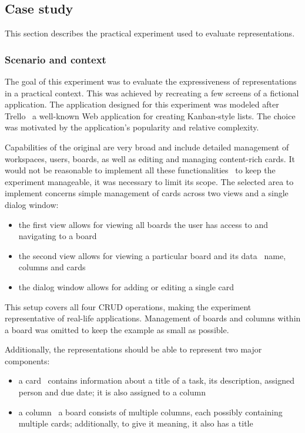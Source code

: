 \subsection{Case study}\label{subsec:case-study}
This section describes the practical experiment used to evaluate representations.

\subsubsection{Scenario and context}
The goal of this experiment was to evaluate the expressiveness of representations in a practical context.
This was achieved by recreating a few screens of a fictional application.
The application designed for this experiment was modeled after Trello \textendash\ a well-known Web application for creating Kanban-style lists.
The choice was motivated by the application's popularity and relative complexity.

Capabilities of the original are very broad and include detailed management of workspaces, users, boards, as well as editing and managing content-rich cards.
It would not be reasonable to implement all these functionalities \textendash\ to keep the experiment manageable, it was necessary to limit its scope.
The selected area to implement concerns simple management of cards across two views and a single dialog window:
\begin{itemize}
    \item the first view allows for viewing all boards the user has access to and navigating to a board
    \item the second view allows for viewing a particular board and its data \textendash\ name, columns and cards
    \item the dialog window allows for adding or editing a single card
\end{itemize}
This setup covers all four CRUD operations, making the experiment representative of real-life applications.
Management of boards and columns within a board was omitted to keep the example as small as possible.

Additionally, the representations should be able to represent two major components:
\begin{itemize}
    \item a card \textendash\ contains information about a title of a task, its description, assigned person and due date; it is also assigned to a column
    \item a column \textendash\ a board consists of multiple columns, each possibly containing multiple cards; additionally, to give it meaning, it also has a title
\end{itemize}

